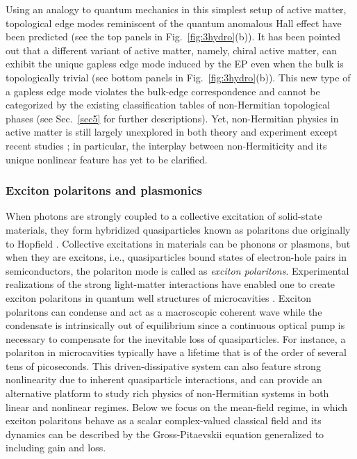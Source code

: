 \documentclass{tADP2e}
\theoremstyle{plain}
\theoremstyle{plain}
\theoremstyle{definition}
\begin{document}
Using an analogy to quantum mechanics in this simplest setup of active matter,  topological edge modes reminiscent of the quantum anomalous Hall effect have been predicted \cite{SK19} (see the top panels in Fig.~\ref{fig:3hydro}(b)). It has been pointed out \cite{SK192} that a different variant of active matter, namely, chiral active matter, can exhibit the unique gapless edge mode induced by the EP even when the bulk is topologically trivial (see bottom panels in Fig.~\ref{fig:3hydro}(b)). This new type of a gapless edge mode  violates the bulk-edge correspondence and cannot be categorized by the existing classification tables  of non-Hermitian topological phases (see Sec.~\ref{sec5} for further descriptions). Yet, non-Hermitian physics in active matter is still largely unexplored in both theory and experiment except recent studies \cite{SK192,SC20,SC202}; in particular, the interplay between non-Hermiticity and its unique nonlinear feature has yet to be clarified.


\subsubsection{Exciton polaritons and plasmonics\label{sechydroexc}}
When photons are strongly coupled to a collective excitation of solid-state materials, they form hybridized quasiparticles known as polaritons due originally to Hopfield \cite{HJJ58}. Collective excitations in materials can be  phonons or plasmons, but when they are excitons, i.e., quasiparticles  bound states of electron-hole pairs in semiconductors, the polariton mode is called as {\it exciton polaritons}. 
Experimental realizations of the strong light-matter interactions have enabled one to create exciton polaritons in quantum well structures of microcavities \cite{YY02,KA07}. Exciton polaritons can condense and act as a macroscopic coherent wave \cite{JK06,BT14} while the condensate is intrinsically out of equilibrium since a continuous optical pump is necessary to compensate for the inevitable loss of quasiparticles. 
For instance, a polariton in microcavities typically have a lifetime that is of the  order of several tens of picoseconds. This driven-dissipative system can also feature strong nonlinearity due to inherent quasiparticle interactions, and can provide an alternative platform to study rich physics of non-Hermitian systems in both linear and nonlinear regimes. Below we focus on the mean-field regime, in which exciton polaritons behave as a scalar complex-valued classical field and its dynamics can be described by the Gross-Pitaevskii equation \cite{Gross1961,Pitaevskii61} generalized to including gain and loss.
\end{document}
